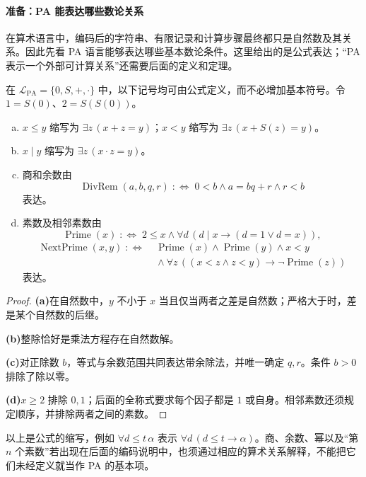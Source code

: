 \documentclass[lang=cn,a4paper,fontset=none,zihao=false,10pt,openany,twoside]{beautybook}
\numberwithin{algorithm}{chapter}
\begin{document}
\paragraph{准备：PA 能表达哪些数论关系}
在算术语言中，编码后的字符串、有限记录和计算步骤最终都只是自然数及其关系。因此先看 PA 语言能够表达哪些基本数论条件。这里给出的是公式表达；“PA 表示一个外部可计算关系”还需要后面的定义和定理。


\begin{example}[用算术语言表达数论关系]
在 $\mathcal L_{\mathrm{PA}}=\{0,S,+,\cdot\}$ 中，以下记号均可由公式定义，而不必增加基本符号。令 $1=S(0)$、$2=S(S(0))$。
\begin{enumerate}[(a)]
\item $x\leq y$ 缩写为 $\exists z\,(x+z=y)$；$x<y$ 缩写为 $\exists z\,(x+S(z)=y)$。
\item $x\mid y$ 缩写为 $\exists z\,(x\cdot z=y)$。
\item 商和余数由
\[
 \operatorname{DivRem}(a,b,q,r)
 \;:\Longleftrightarrow\;0<b\wedge a=bq+r\wedge r<b
\]
表达。
\item 素数及相邻素数由
\[
 \operatorname{Prime}(x)\;:\Longleftrightarrow\;
 2\leq x\wedge\forall d\,(d\mid x\to(d=1\vee d=x)),
\]
\[
 \begin{aligned}
 \operatorname{NextPrime}(x,y)\;:\Longleftrightarrow\;&
 \operatorname{Prime}(x)\wedge\operatorname{Prime}(y)\wedge x<y\\
 &{}\wedge\forall z\,((x<z\wedge z<y)\to\neg\operatorname{Prime}(z))
 \end{aligned}
\]
表达。
\end{enumerate}
\end{example}
\begin{proof}
\par\smallskip\noindent\textbf{(a)}\quad 在自然数中，$y$ 不小于 $x$ 当且仅当两者之差是自然数；严格大于时，差是某个自然数的后继。
\par\smallskip\noindent\textbf{(b)}\quad 整除恰好是乘法方程存在自然数解。
\par\smallskip\noindent\textbf{(c)}\quad 对正除数 $b$，等式与余数范围共同表达带余除法，并唯一确定 $q,r$。条件 $b>0$ 排除了除以零。
\par\smallskip\noindent\textbf{(d)}\quad $x\geq2$ 排除 $0,1$；后面的全称式要求每个因子都是 $1$ 或自身。相邻素数还须规定顺序，并排除两者之间的素数。
\end{proof}
以上是公式的缩写，例如 $\forall d\leq t\,\alpha$ 表示 $\forall d\,(d\leq t\to\alpha)$。商、余数、幂以及“第 $n$ 个素数”若出现在后面的编码说明中，也须通过相应的算术关系解释，不能把它们未经定义就当作 PA 的基本项。
\end{document}
